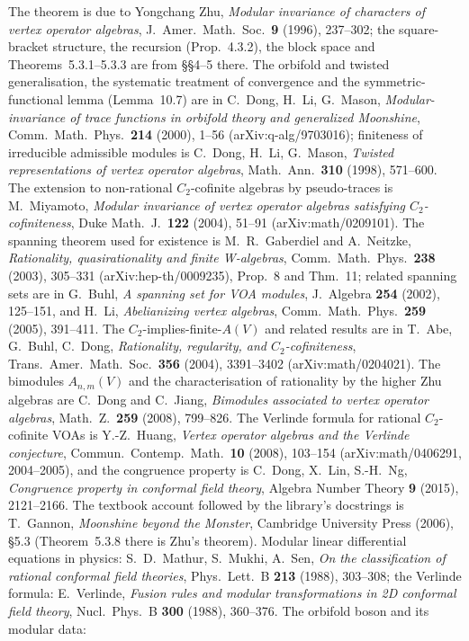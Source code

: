 The theorem is due to Yongchang Zhu, \emph{Modular invariance of characters of vertex operator algebras}, J.\ Amer.\ Math.\
Soc.\ \textbf{9} (1996), 237--302; the square-bracket structure, the recursion (Prop.~4.3.2), the block space and
Theorems~5.3.1--5.3.3 are from \S\S4--5 there. The orbifold and twisted generalisation, the systematic treatment of
convergence and the symmetric-functional lemma (Lemma~10.7) are in C.~Dong, H.~Li, G.~Mason, \emph{Modular-invariance of
trace functions in orbifold theory and generalized Moonshine}, Comm.\ Math.\ Phys.\ \textbf{214} (2000), 1--56
(arXiv:q-alg/9703016); finiteness of irreducible admissible modules is C.~Dong, H.~Li, G.~Mason, \emph{Twisted
representations of vertex operator algebras}, Math.\ Ann.\ \textbf{310} (1998), 571--600. The extension to non-rational
$C_2$-cofinite algebras by pseudo-traces is M.~Miyamoto, \emph{Modular invariance of vertex operator algebras satisfying
$C_2$-cofiniteness}, Duke Math.\ J.\ \textbf{122} (2004), 51--91 (arXiv:math/0209101). The spanning theorem used for
existence is M.~R.~Gaberdiel and A.~Neitzke, \emph{Rationality, quasirationality and finite W-algebras}, Comm.\ Math.\
Phys.\ \textbf{238} (2003), 305--331 (arXiv:hep-th/0009235), Prop.~8 and Thm.~11; related spanning sets are in G.~Buhl,
\emph{A spanning set for VOA modules}, J.\ Algebra \textbf{254} (2002), 125--151, and H.~Li, \emph{Abelianizing vertex
algebras}, Comm.\ Math.\ Phys.\ \textbf{259} (2005), 391--411. The $C_2$-implies-finite-$A(V)$ and related results are in T.~Abe,
G.~Buhl, C.~Dong, \emph{Rationality, regularity, and $C_2$-cofiniteness}, Trans.\ Amer.\ Math.\ Soc.\ \textbf{356} (2004),
3391--3402 (arXiv:math/0204021). The bimodules $A_{n,m}(V)$ and the characterisation of rationality by the higher Zhu
algebras are C.~Dong and C.~Jiang, \emph{Bimodules associated to vertex operator algebras}, Math.\ Z.\ \textbf{259} (2008),
799--826. The Verlinde formula for rational $C_2$-cofinite VOAs is Y.-Z.~Huang, \emph{Vertex operator algebras and the
Verlinde conjecture}, Commun.\ Contemp.\ Math.\ \textbf{10} (2008), 103--154 (arXiv:math/0406291, 2004--2005), and the
congruence property is C.~Dong, X.~Lin, S.-H.~Ng, \emph{Congruence property in conformal field theory}, Algebra Number Theory
\textbf{9} (2015), 2121--2166. The textbook account followed by the library's docstrings is T.~Gannon, \emph{Moonshine
beyond the Monster}, Cambridge University Press (2006), \S5.3 (Theorem~5.3.8 there is Zhu's theorem). Modular linear
differential equations in physics: S.~D.~Mathur, S.~Mukhi, A.~Sen, \emph{On the classification of rational conformal field
theories}, Phys.\ Lett.\ B \textbf{213} (1988), 303--308; the Verlinde formula: E.~Verlinde, \emph{Fusion rules and modular
transformations in 2D conformal field theory}, Nucl.\ Phys.\ B \textbf{300} (1988), 360--376. The orbifold boson and its modular data:
